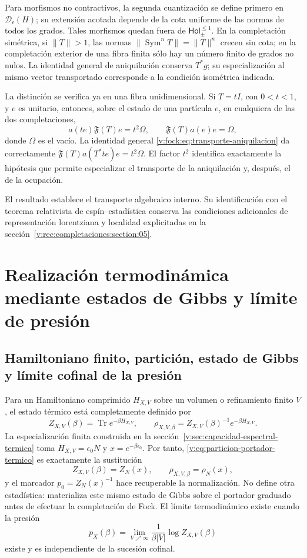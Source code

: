 Para morfismos no contractivos, la segunda cuantización se define primero
en \(\mathcal D_\epsilon(H)\); su extensión acotada depende de la cota
uniforme de las normas de todos los grados. Tales morfismos quedan fuera
de \(\mathsf{Hol}_{\pm}^{\leq1}\). En la completación simétrica, si
\(\|T\|>1\), las normas \(\|\operatorname{Sym}^nT\|=\|T\|^n\)
crecen sin cota; en la completación exterior de una fibra finita sólo
hay un número finito de grados no nulos. La identidad general de
aniquilación conserva \(T^*g\); su especialización al mismo vector
transportado corresponde a la condición isométrica indicada.

La distinción se verifica ya en una fibra unidimensional. Si
\(T=tI\), con \(0<t<1\), y \(e\) es unitario, entonces, sobre el estado
de una partícula \(e\), en cualquiera de las dos completaciones,
\begin{equation}
 a(te)\mathfrak F(T)e=t^2\Omega,
 \qquad \mathfrak F(T)a(e)e=\Omega,
 \label{v:fock:eq:control-no-isometrico}
\end{equation}
donde \(\Omega\) es el vacío. La identidad general
\eqref{v:fock:eq:transporte-aniquilacion} da correctamente
\(\mathfrak F(T)a(T^*te)e=t^2\Omega\). El factor \(t^2\) identifica
exactamente la hipótesis que permite especializar el transporte de la
aniquilación y, después, el de la ocupación.

El resultado establece el transporte algebraico interno. Su identificación
con el teorema relativista de espín--estadística conserva las condiciones
adicionales de representación lorentziana y localidad explicitadas en la
sección~\ref{v:rec:completaciones:section:05}.

\clearpage
\section{Realización termodinámica mediante estados de Gibbs y límite de presión}
\label{v:rec:fock_gibbs:section:04}

\subsection{Hamiltoniano finito, partición, estado de Gibbs y límite cofinal de la presión}
\label{v:rec:fock_gibbs:section:05}

Para un Hamiltoniano comprimido \(H_{X,V}\) sobre un volumen o refinamiento
finito \(V\), el estado térmico está completamente definido por
\[
 Z_{X,V}(\beta)=\operatorname{Tr}e^{-\beta H_{X,V}},
 \qquad
 \rho_{X,V,\beta}=Z_{X,V}(\beta)^{-1}e^{-\beta H_{X,V}}.
\]
La especialización finita construida en la
sección~\ref{v:sec:capacidad-espectral-termica} toma
$H_{X,V}=\epsilon_0N$ y $x=e^{-\beta\epsilon_0}$. Por tanto,
\eqref{v:eq:particion-portador-termico} es exactamente la sustitución
\[
 Z_{X,V}(\beta)=Z_N(x),\qquad
 \rho_{X,V,\beta}=\rho_N(x),
\]
y el marcador $p_0=Z_N(x)^{-1}$ hace recuperable la normalización. No
define otra estadística: materializa este mismo estado de Gibbs sobre el
portador graduado antes de efectuar la completación de Fock.
El límite termodinámico existe cuando la presión
\[
 p_X(\beta)=\lim_{V\nearrow\infty}
 \frac1{\beta |V|}\log Z_{X,V}(\beta)
\]
existe y es independiente de la sucesión cofinal.

